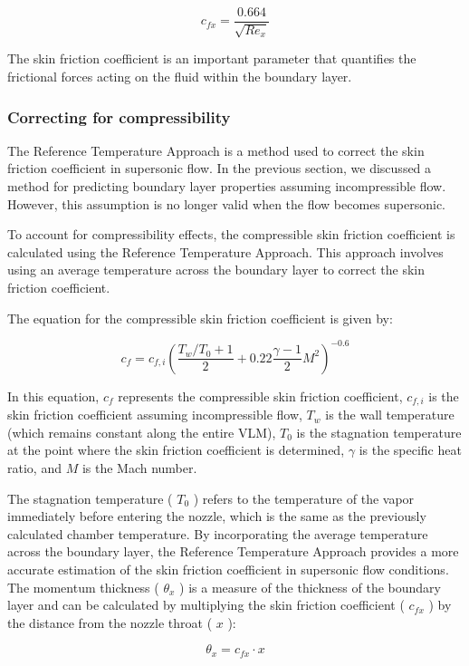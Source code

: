 \documentclass{homework}
\begin{document}
\begin{multicols}{2}
		  $$c_{f x}=\frac{0.664}{\sqrt{R e_x}}$$  
		    
		  The skin friction coefficient is an important parameter that quantifies the frictional forces acting on the fluid within the boundary layer.  
    
\subsubsection{Correcting for compressibility}
		    
		  The Reference Temperature Approach is a method used to correct the skin friction coefficient in supersonic flow. In the previous section, we discussed a method for predicting boundary layer properties assuming incompressible flow. However, this assumption is no longer valid when the flow becomes supersonic.  
		    
		  To account for compressibility effects, the compressible skin friction coefficient is calculated using the Reference Temperature Approach. This approach involves using an average temperature across the boundary layer to correct the skin friction coefficient.  
		    
		  The equation for the compressible skin friction coefficient is given by:  
		    
		  $$c_f=c_{f, i}\left(\frac{T_w / T_0+1}{2}+0.22 \frac{\gamma-1}{2} M^2\right)^{-0.6}$$  
		    
		  In this equation, $c_f$ represents the compressible skin friction coefficient, $c_{f, i}$ is the skin friction coefficient assuming incompressible flow, $T_w$ is the wall temperature (which remains constant along the entire VLM), $T_0$ is the stagnation temperature at the point where the skin friction coefficient is determined, $\gamma$ is the specific heat ratio, and $M$ is the Mach number.  
		    
		  The stagnation temperature ( $T_0$ ) refers to the temperature of the vapor immediately before entering the nozzle, which is the same as the previously calculated chamber temperature. By incorporating the average temperature across the boundary layer, the Reference Temperature Approach provides a more accurate estimation of the skin friction coefficient in supersonic flow conditions.  
The momentum thickness ( $\theta_x$ ) is a measure of the thickness of the boundary layer and can be calculated by multiplying the skin friction coefficient ( $c_{f x}$ ) by the distance from the nozzle throat ( $x$ ):
		    
		  $$\theta_x=c_{f x} \cdot x$$  
		    

\end{multicols}
\end{document}
